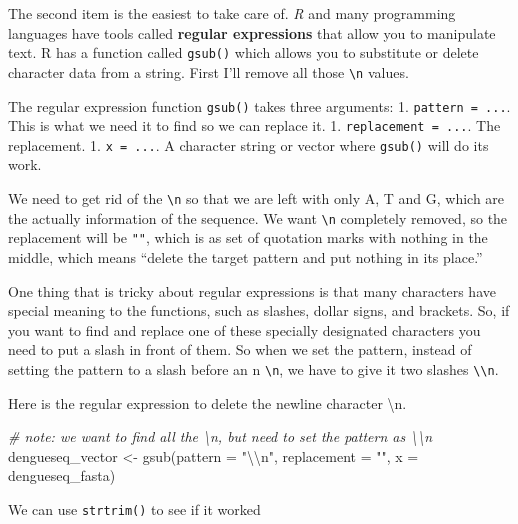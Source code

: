 \documentclass[
]{book}
\newenvironment{Shaded}{\begin{snugshade}}{\end{snugshade}}
\newcommand{\AttributeTok}[1]{\textcolor[rgb]{0.77,0.63,0.00}{#1}}
\newcommand{\CommentTok}[1]{\textcolor[rgb]{0.56,0.35,0.01}{\textit{#1}}}
\newcommand{\FunctionTok}[1]{\textcolor[rgb]{0.00,0.00,0.00}{#1}}
\newcommand{\NormalTok}[1]{#1}
\newcommand{\OtherTok}[1]{\textcolor[rgb]{0.56,0.35,0.01}{#1}}
\newcommand{\SpecialCharTok}[1]{\textcolor[rgb]{0.00,0.00,0.00}{#1}}
\newcommand{\StringTok}[1]{\textcolor[rgb]{0.31,0.60,0.02}{#1}}
\begin{document}
The second item is the easiest to take care of. \emph{R} and many programming languages have tools called \textbf{regular expressions} that allow you to manipulate text. R has a function called \texttt{gsub()} which allows you to substitute or delete character data from a string. First I'll remove all those \texttt{\textbackslash{}n} values.

The regular expression function \texttt{gsub()} takes three arguments:
1. \texttt{pattern\ =\ ...}. This is what we need it to find so we can replace it.
1. \texttt{replacement\ =\ ...}. The replacement.
1. \texttt{x\ =\ ...}. A character string or vector where \texttt{gsub()} will do its work.

We need to get rid of the \texttt{\textbackslash{}n} so that we are left with only A, T and G, which are the actually information of the sequence. We want \texttt{\textbackslash{}n} completely removed, so the replacement will be \texttt{""}, which is as set of quotation marks with nothing in the middle, which means ``delete the target pattern and put nothing in its place.''

One thing that is tricky about regular expressions is that many characters have special meaning to the functions, such as slashes, dollar signs, and brackets. So, if you want to find and replace one of these specially designated characters you need to put a slash in front of them. So when we set the pattern, instead of setting the pattern to a slash before an n \texttt{\textbackslash{}n}, we have to give it two slashes \texttt{\textbackslash{}\textbackslash{}n}.

Here is the regular expression to delete the newline character \textbackslash n.

\begin{Shaded}
\begin{Highlighting}[]
 \CommentTok{\# note: we want to find all the \textbackslash{}n, but need to set the pattern as \textbackslash{}\textbackslash{}n}
\NormalTok{dengueseq\_vector }\OtherTok{\textless{}{-}} \FunctionTok{gsub}\NormalTok{(}\AttributeTok{pattern =} \StringTok{"}\SpecialCharTok{\textbackslash{}\textbackslash{}}\StringTok{n"}\NormalTok{,  }
                         \AttributeTok{replacement =} \StringTok{""}\NormalTok{, }
                         \AttributeTok{x =}\NormalTok{ dengueseq\_fasta)}
\end{Highlighting}
\end{Shaded}

We can use \texttt{strtrim()} to see if it worked
\end{document}
